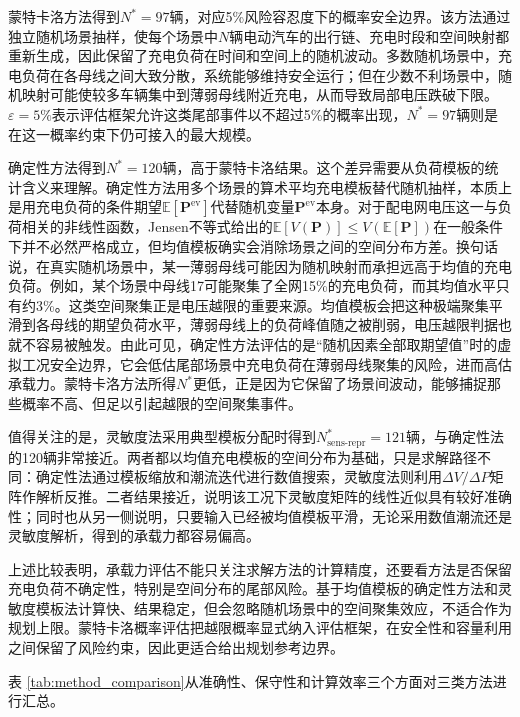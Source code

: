 \documentclass[10pt,a4paper]{article}
\numberwithin{equation}{section}
\numberwithin{table}{section}
\numberwithin{figure}{section}
\begin{document}
    蒙特卡洛方法得到$N^* = 97$辆，对应5\%风险容忍度下的概率安全边界。该方法通过独立随机场景抽样，使每个场景中$N$辆电动汽车的出行链、充电时段和空间映射都重新生成，因此保留了充电负荷在时间和空间上的随机波动。多数随机场景中，充电负荷在各母线之间大致分散，系统能够维持安全运行；但在少数不利场景中，随机映射可能使较多车辆集中到薄弱母线附近充电，从而导致局部电压跌破下限。$\varepsilon = 5\%$表示评估框架允许这类尾部事件以不超过5\%的概率出现，$N^* = 97$辆则是在这一概率约束下仍可接入的最大规模。

    确定性方法得到$N^* = 120$辆，高于蒙特卡洛结果。这个差异需要从负荷模板的统计含义来理解。确定性方法用多个场景的算术平均充电模板替代随机抽样，本质上是用充电负荷的条件期望$\mathbb{E}[\mathbf{P}^{\text{ev}}]$代替随机变量$\mathbf{P}^{\text{ev}}$本身。对于配电网电压这一与负荷相关的非线性函数，Jensen不等式给出的$\mathbb{E}[V(\mathbf{P})] \leq V(\mathbb{E}[\mathbf{P}])$在一般条件下并不必然严格成立，但均值模板确实会消除场景之间的空间分布方差。换句话说，在真实随机场景中，某一薄弱母线可能因为随机映射而承担远高于均值的充电负荷。例如，某个场景中母线17可能聚集了全网15\%的充电负荷，而其均值水平只有约3\%。这类空间聚集正是电压越限的重要来源。均值模板会把这种极端聚集平滑到各母线的期望负荷水平，薄弱母线上的负荷峰值随之被削弱，电压越限判据也就不容易被触发。由此可见，确定性方法评估的是“随机因素全部取期望值”时的虚拟工况安全边界，它会低估尾部场景中充电负荷在薄弱母线聚集的风险，进而高估承载力。蒙特卡洛方法所得$N^*$更低，正是因为它保留了场景间波动，能够捕捉那些概率不高、但足以引起越限的空间聚集事件。

    值得关注的是，灵敏度法采用典型模板分配时得到$N^*_{\text{sens-repr}} = 121$辆，与确定性法的120辆非常接近。两者都以均值充电模板的空间分布为基础，只是求解路径不同：确定性法通过模板缩放和潮流迭代进行数值搜索，灵敏度法则利用$\Delta V/\Delta P$矩阵作解析反推。二者结果接近，说明该工况下灵敏度矩阵的线性近似具有较好准确性；同时也从另一侧说明，只要输入已经被均值模板平滑，无论采用数值潮流还是灵敏度解析，得到的承载力都容易偏高。

    上述比较表明，承载力评估不能只关注求解方法的计算精度，还要看方法是否保留充电负荷不确定性，特别是空间分布的尾部风险。基于均值模板的确定性方法和灵敏度模板法计算快、结果稳定，但会忽略随机场景中的空间聚集效应，不适合作为规划上限。蒙特卡洛概率评估把越限概率显式纳入评估框架，在安全性和容量利用之间保留了风险约束，因此更适合给出规划参考边界。

    表 \ref{tab:method_comparison}从准确性、保守性和计算效率三个方面对三类方法进行汇总。
\end{document}
